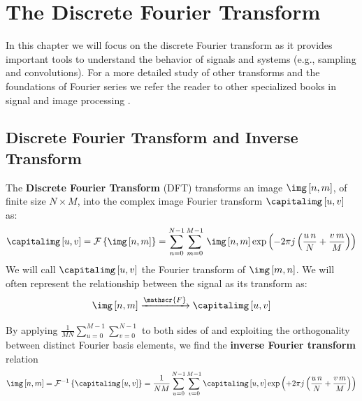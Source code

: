%
%


\section{The Discrete Fourier Transform}

In this chapter we will focus on the discrete Fourier transform as it provides important tools to understand the behavior of signals and systems (e.g., sampling and convolutions). For a more detailed study of other transforms and the foundations of Fourier series we refer the reader to other specialized books in signal and image processing .

\subsection{Discrete Fourier Transform and Inverse Transform}

The {\bf Discrete Fourier Transform} (DFT) transforms an image $\img \left[n,m \right]$, of finite size $N \times M$, into the complex image Fourier transform $\capitalimg \left[u,v \right]$ as:
\begin{equation}
	\capitalimg \left[u,v \right] =
	\mathcal{F} \left\{ \img \left[n,m \right] \right\}
	=
	\sum_{n=0}^{N-1} \sum_{m=0}^{M-1} \, \img \left[n,m \right]
	\exp{ \left( -2\pi j \left( \frac{u\, n}{N} + \frac{v\, m}{M} \right) \right)}
	\label{eq:fourier}
\end{equation}
We will call $\capitalimg \left[u,v \right]$ the Fourier transform of $\img \left[m,n \right]$. We will often represent the relationship between the signal as its transform as:
\begin{equation}
	\img \left[n,m \right] \xrightarrow{\mathscr{F}} \capitalimg \left[u,v \right]
\end{equation}


By applying
$\frac{1}{MN} \sum_{u=0}^{M-1} \sum_{v=0}^{N-1}$
to both sides of \eqn{\ref{eq:fourier}} and exploiting the orthogonality between distinct Fourier basis elements, we find the {\bf inverse Fourier transform} relation
\begin{equation}
	\img \left[n,m \right] =
	\mathcal{F}^{-1} \left\{ \capitalimg \left[u,v \right] \right\}
	=
	\frac{1}{NM} \sum_{u=0}^{N-1} \sum_{v=0}^{M-1} \capitalimg \left[u,v \right]
	\exp{ \left(+2\pi j \left(\frac{u\, n}{N} + \frac{v\, m}{M} \right) \right) }
	\label{eq:inversefourier}
\end{equation}


